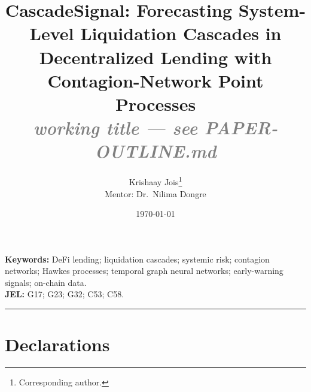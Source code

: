 \theoremstyle{definition}
\newtheorem{definition}{Definition}
\newtheorem{assumption}{Assumption}



\title{\textbf{CascadeSignal: Forecasting System-Level Liquidation
Cascades in Decentralized Lending with Contagion-Network Point Processes}
\\[4pt]\large\textcolor{gray}{\itshape working title --- see PAPER-OUTLINE.md}}

\author{%
  Krishaay Jois\thanks{Corresponding author.}\\
  \small Mentor: Dr.\ Nilima Dongre\\
  \small {}}

\date{\today}
\maketitle





\medskip
\noindent\textbf{Keywords:} DeFi lending; liquidation cascades; systemic risk;
contagion networks; Hawkes processes; temporal graph neural networks;
early-warning signals; on-chain data.\\
\noindent\textbf{JEL:} G17; G23; G32; C53; C58. 

\bigskip\hrule\bigskip















\section*{Declarations}
